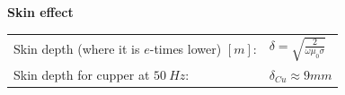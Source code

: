 \textbf{\\ \\ Skin effect\\}
\begin{tabular}{ll}
	Skin depth (where it is $e$-times lower) $[m]$: & \(\displaystyle \delta = \sqrt{\frac{2}{\omega \mu_0\sigma}} \) \\
	Skin depth for cupper at $50~Hz$: & \(\displaystyle \delta_{Cu} \approx 9mm \)
\end{tabular}


